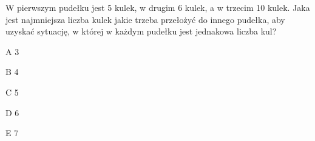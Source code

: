 \begin{tresc}
W pierwszym pudełku jest 5 kulek, w drugim 6 kulek, a w trzecim 10 kulek. Jaka jest najmniejsza liczba kulek jakie trzeba przełożyć do innego pudełka, aby uzyskać sytuację, w której w każdym pudełku jest jednakowa liczba kul?
\end{tresc}
\begin{wariant}{A} 3 \end{wariant}
\begin{wariant}{B} 4 \end{wariant}
\begin{wariant}{C} 5 \end{wariant}
\begin{wariant}{D} 6 \end{wariant}
\begin{wariant}{E} 7 \end{wariant}
